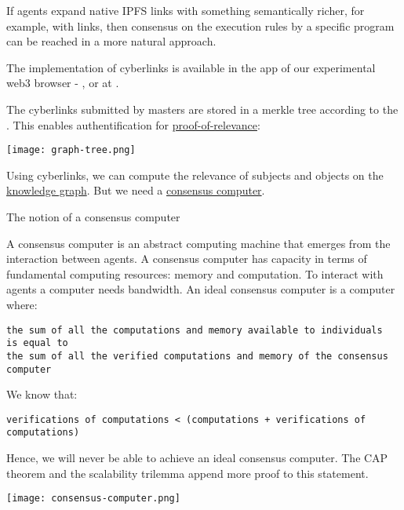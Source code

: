 \documentclass[8pt,oneside]{amsart}
\makeatletter
\newcommand{\linkred}[2]{\href{#1}{\color{red}{#2}}}
\newcommand{\linkgreen}[2]{\href{#1}{\color{green}{#2}}}
\renewcommand\subsection{\@startsection{subsection}
                                    {2}{\z@}
                                    {-3.25ex\@plus -1ex \@minus -.2ex}
                                    {0ex \@plus .2ex}
                                    {\play\Large}
                        }
\newcommand{\titleSection}[1]{\subsection{#1}}
\newenvironment{Figure}
  {\par\medskip\noindent\minipage{\linewidth}}
  {\endminipage\par\medskip}
\makeatother
\begin{document}
If agents expand native IPFS links with something semantically richer, for example, with
\linkred{https://github.com/cybercongress/cyb/blob/dev/docs/dura.md}{dura}
links, then consensus on the execution rules by a specific program can be reached in a more natural approach.

The \linkred{https://github.com/cybercongress/go-cyber}{go-cyber} implementation of cyberlinks is available in the \linkred{https://github.com/cybercongress/dot-cyber}{.cyber} app of our experimental web3 browser - \linkred{https://cyb.ai}{cyb}, or at \linkred{http://cyber.page}{cyber.page}.

The cyberlinks submitted by masters are stored in a merkle tree according to the \linkgreen{https://ipfs.io/ipfs/QmZpJLmc3T2L1FLUxzvU3P8MBCPe15fEmUyVS7Bz8ZKMhG}{RFC-6962 standard}. This enables authentification for {\hyperref[proof-of-relevance]{proof-of-relevance}}:

\begin{Figure}
    \centering
    \texttt{[image: graph-tree.png]}
\end{Figure}

Using cyberlinks, we can compute the relevance of subjects and objects on the {\hyperref[knowledge-graph]{knowledge graph}}. But we need a {\hyperref[consensus-computer]{consensus computer}}.

\titleSection{The notion of a consensus computer}\label{consensus-computer}

A consensus computer is an abstract computing machine that emerges from the interaction between agents. A consensus computer has capacity in terms of fundamental computing resources: memory and computation. To interact with agents a computer needs bandwidth. An ideal consensus computer is a computer where:
\\
\begin{lstlisting}
the sum of all the computations and memory available to individuals
is equal to
the sum of all the verified computations and memory of the consensus computer
\end{lstlisting}

We know that:
\begin{lstlisting}
verifications of computations < (computations + verifications of computations)
\end{lstlisting}

Hence, we will never be able to achieve an ideal consensus computer. The CAP theorem and the scalability trilemma append more proof to this statement.
\begin{Figure}
    \centering
    \texttt{[image: consensus-computer.png]}
\end{Figure}
\end{document}

